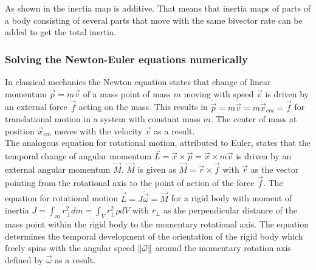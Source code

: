 As shown in \cite{Dynamics_in_PGA_plane-based_Dorst-DeKennik:2023} the inertia map is
additive. That means that inertia maps of parts of a body consisting of several parts that
move with the same bivector rate can be added to get the total inertia. \\


\newpage

\subsubsection{Solving the Newton-Euler equations numerically}
\label{subsubsection:solving_newton-euler_numerically}

In classical mechanics the Newton equation states that change of linear momentum $\vec{p}
= m \vec{v}$ of a mass point of mass $m$ moving with speed $\vec{v}$ is driven by an
external force $\vec{f}$ acting on the mass. This results in $\dot{\vec{p}} = m
\dot{\vec{v}} = m \ddot{\vec{x}}_{cm} = \vec{f}$ for translational motion in a system with
constant mass $m$. The center of mass at position $\vec{x}_{cm}$ moves with the velocity
$\vec{v}$ as a result. \\

The analogous equation for rotational motion, attributed to Euler, states that the
temporal change of angular momentum $\vec{L} = \vec{x} \times \vec{p} = \vec{x} \times m
\vec{v}$ is driven by an external angular momentum $\vec{M}$. $\vec{M}$ is given as
$\vec{M} = \vec{r} \times \vec{f}$ with $\vec{r}$ as the vector pointing from the
rotational axis to the point of action of the force $\vec{f}$. The equation for rotational
motion $\dot{\vec{L}} = J \dot{\vec{\omega}} = \vec{M}$ for a rigid body with moment of
inertia $J = \int_{m}{r^2_\perp dm} = \int_{V}{r^2_\perp \rho dV}$ with $r_\perp$ as the
perpendicular distance of the mass point within the rigid body to the momentary rotational
axis. The equation determines the temporal development of the orientation of the rigid
body which freely spins with the angular speed $\left \lVert {\vec{\omega}} \right \rVert$ around the momentary
rotation axis defined by $\vec{\omega}$  as a result. \\

